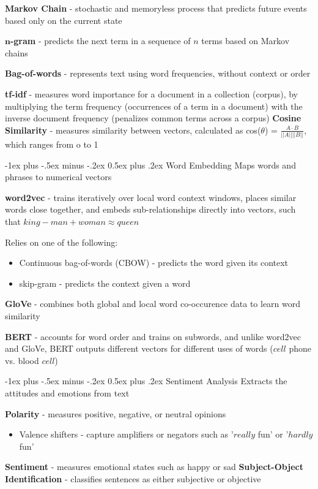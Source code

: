 \documentclass[10pt,landscape]{article}
\makeatletter
\renewcommand{\subsection}{\@startsection{subsection}{2}{0mm}%
                                {-1ex plus -.5ex minus -.2ex}%
                                {0.5ex plus .2ex}%
                                {\normalfont\normalsize\bfseries}}
\makeatother
\begin{document}
\begin{multicols}{3}
\textbf{Markov Chain} - stochastic and memoryless process that predicts future events based only on the current state

$\boldsymbol{n}$\textbf{-gram} - predicts the next term in a sequence of $n$ terms based on Markov chains

\textbf{Bag-of-words} - represents text using word frequencies, without context or order

\textbf{tf-idf} - measures word importance for a document in a collection (corpus), by multiplying the term frequency (occurrences of a term in a document) with the inverse document frequency (penalizes common terms across a corpus)
\textbf{Cosine Similarity} - measures similarity between vectors, calculated as cos($\theta$) =
$\frac{A\cdot B}{||A||||B||} $, which ranges from o to 1

\subsection{Word Embedding}
Maps words and phrases to numerical vectors 

\textbf{word2vec} - trains iteratively over local  word context windows, places similar words close together, and embeds sub-relationships directly into vectors, such that $king - man + woman \approx queen$

Relies on one of the following:
\begin{itemize}[label={--},leftmargin=4mm]
\itemsep -.4mm 
\item Continuous bag-of-words (CBOW) - predicts the word given its context
\item skip-gram - predicts the context given a word
\end{itemize}

\textbf{GloVe} - combines both global and local word co-occurence data to learn word similarity

\textbf{BERT} - accounts for word order and trains on subwords, and unlike word2vec and GloVe, BERT outputs different vectors for different uses of words ($cell$ phone vs. blood $cell$)

\subsection{Sentiment Analysis}
Extracts the attitudes and emotions from text

\textbf{Polarity} - measures positive, negative, or neutral opinions
\begin{itemize}[label={--},leftmargin=4mm]
\itemsep -.4mm 
\item Valence shifters - capture amplifiers or negators such as '$really$ fun' or '$hardly$ fun'
\end{itemize}
\textbf{Sentiment} - measures emotional states such as happy or sad
\textbf{Subject-Object Identification} - classifies sentences as either subjective or objective

\end{multicols}
\end{document}
